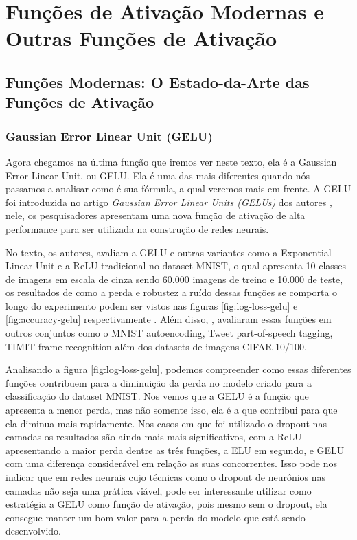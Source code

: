 
\chapter{Funções de Ativação Modernas e Outras Funções de Ativação}
\label{cap:ativacao-modernas-outras}

\section{Funções Modernas: O Estado-da-Arte das Funções de Ativação}

\subsection{Gaussian Error Linear Unit (GELU)} 

Agora chegamos na última função que iremos ver neste texto, ela é a Gaussian Error Linear Unit, ou GELU. Ela é uma das mais diferentes quando nós passamos a analisar como é sua fórmula, a qual veremos mais em frente. A GELU foi introduzida no artigo \textit{Gaussian Error Linear Units (GELUs)} dos autores \textcite{GELUArticle}, nele, os pesquisadores apresentam uma nova função de ativação de alta performance para ser utilizada na construção de redes neurais.

No texto, os autores, avaliam a GELU e outras variantes como a Exponential Linear Unit e a ReLU tradicional no dataset MNIST, o qual apresenta 10 classes de imagens em escala de cinza sendo 60.000 imagens de treino e 10.000 de teste, os resultados de como a perda e robustez a ruído dessas funções se comporta o longo do experimento podem ser vistos nas figuras \ref{fig:log-loss-gelu} e \ref{fig:accuracy-gelu} respectivamente \parencite{GELUArticle}. Além disso, \textcite{GELUArticle}, avaliaram essas funções em outros conjuntos como o MNIST autoencoding, Tweet part-of-speech tagging, TIMIT frame recognition além dos datasets de imagens CIFAR-10/100. 

Analisando a figura \ref{fig:log-loss-gelu}, podemos compreender como essas diferentes funções contribuem para a diminuição da perda no modelo criado para a classificação do dataset MNIST. Nos vemos que a GELU é a função que apresenta a menor perda, mas não somente isso, ela é a que contribui para que ela diminua mais rapidamente. Nos casos em que foi utilizado o dropout nas camadas os resultados são ainda mais mais significativos, com a ReLU apresentando a maior perda dentre as três funções, a ELU em segundo, e GELU com uma diferença considerável em relação as suas concorrentes. Isso pode nos indicar que em redes neurais cujo técnicas como o dropout de neurônios nas camadas não seja uma prática viável, pode ser interessante utilizar como estratégia a GELU como função de ativação, pois mesmo sem o dropout, ela consegue manter um bom valor para a perda do modelo que está sendo desenvolvido.

